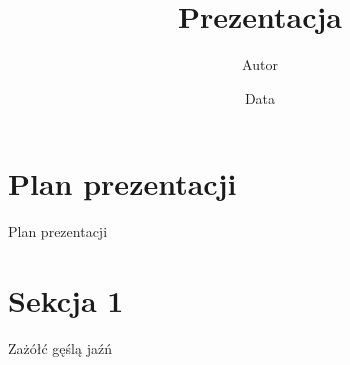 \documentclass[]{beamer}
\title{Prezentacja}
\author{Autor}
\date{Data}
\begin{document}
\maketitle

\section*{Plan prezentacji}

\begin{frame}{Plan prezentacji}
    \tableofcontents
\end{frame}

\section{Sekcja 1}

\begin{frame}{Zażółć gęślą jaźń}
    
\end{frame}
\end{document}
